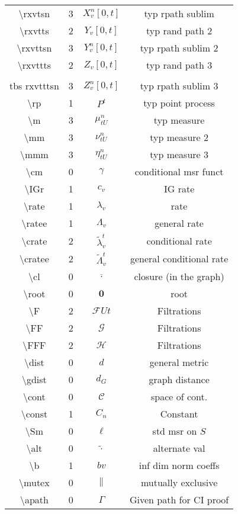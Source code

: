 \documentclass[12pt]{article}
\newcommand{\mc}{\mathcal}
\newcommand{\ov}{\overline}
\newcommand{\tbs}{\textbackslash}
\renewcommand{\root}{\mathbf{0}}				%
\renewcommand{\v}{v}							%
\renewcommand{\U}{U}							%
\renewcommand{\S}{S}							%
\renewcommand{\b}{b}							%
\renewcommand{\t}{t}							%
\newcommand{\F}{\mc{F}}							%
\newcommand{\FG}[2]{\mc{G}}						%
\newcommand{\FH}[2]{\mc{H}}						%
\newcommand{\cl}{\ov}							%
\newcommand{\numb}{n}								%
\newcommand{\rxvtsn}[3]{X_{#1}^{#3}{#2}}			%
\newcommand{\rxvtts}[2]{Y_{#1}{#2}}					%
\newcommand{\rxvttsn}[3]{Y_{#1}^{#3}{#2}}			%
\newcommand{\rxvttts}[2]{Z_{#1}{#2}}				%
\newcommand{\rxvtttsn}[3]{Z_{#1}^{#3}{#2}}			%
\newcommand{\rp}[1]{P^{#1}}							%
\newcommand{\m}[3]{\mu_{#2#1}^{#3}}						%
\newcommand{\mm}[3]{\nu_{#2#1}^{#3}}						%
\newcommand{\mmm}[3]{\eta_{#2#1}^{#3}}						%
\newcommand{\cm}{\gamma}							%
\newcommand{\IGr}[1]{c_{#1}}						%
\newcommand{\rate}[1]{\lambda_{#1}}					%
\newcommand{\ratee}[1]{\Lambda_{#1}}				%
\newcommand{\crate}[2]{\alt{\lambda}_{#1}^{#2}}		%
\newcommand{\cratee}[2]{\alt{\Lambda}_{#1}^{#2}} 	%
\newcommand{\dist}{d}								%
\newcommand{\gdist}{d_G}							%
\newcommand{\cont}{\mc{C}}							%
\newcommand{\const}[1]{C_{#1}}						%
\newcommand{\Sm}{\ell}								%
\newcommand{\alt}{\widetilde}						%
\newcommand{\mutex}{\|}								%
\newcommand{\apath}{\Gamma}						%
\begin{document}
\begin{longtable}{c|c|c|c}
\tbs rxvtsn&3&\(\rxvtsn{\v}{[0,\t]}{\numb}\)	&typ rpath sublim\\
\tbs rxvtts&2&\(\rxvtts{\v}{[0,\t]}\)					&typ rand path 2\\
\tbs rxvttsn&3&\(\rxvttsn{\v}{[0,\t]}{\numb}\)	&typ rpath sublim 2\\
\tbs rxvttts&2&\(\rxvttts{\v}{[0,\t]}\)				&typ rand path 3\\\\tbs rxvtttsn&3&\(\rxvtttsn{\v}{[0,\t]}{\numb}\)	&typ rpath sublim 3\\
\tbs rp&1& \(\rp{\t}\)						&typ point process\\
\tbs m&3&\(\m{\U}{\t}{\numb}\)						&typ measure\\
\tbs mm&3&\(\mm{\U}{\t}{\numb}\)						&typ measure 2\\
\tbs mmm&3&\(\mmm{\U}{\t}{\numb}\)						&typ measure 3\\
\tbs cm&0&\(\cm\)							&conditional msr funct\\
\tbs IGr&1&\(\IGr{\v}\)						&IG rate\\
\tbs rate&1&\(\rate{\v}\)					&rate\\
\tbs ratee&1&\(\ratee{\v}\)					&general rate\\
\tbs crate&2&\(\crate{\v}{\t}\)		&conditional rate\\
\tbs cratee&2&\(\cratee{\v}{\t}\)		&general conditional rate\\
\tbs cl&0&\(\cl{\cdot}\)			&closure (in the graph)\\
\tbs root&0&\(\root\)				&root\\
\tbs F&2&\(\F{\U}{\t}\)&Filtrations\\
\tbs FF&2&\(\FG{\U}{\t}\)&Filtrations\\
\tbs FFF&2&\(\FH{\U}{\t}\)&Filtrations\\
\tbs dist&0& \(\dist\)				&general metric\\
\tbs gdist &0& \(\gdist\)			&graph distance\\
\tbs cont &0& \(\cont\)				&space of cont. \\
\tbs const &1& \(\const{\numb}\)	&Constant\\
\tbs Sm&0&\(\Sm\)							&std msr on \(\S\)\\
\tbs alt&0&\(\widetilde{\cdot}\)			&alternate val\\
\tbs b&1& \(\b{\v}\)						&inf dim norm coeffs\\
\tbs mutex&0&\(\mutex\)						&mutually exclusive\\
\tbs apath&0&\(\apath\)						&Given path for CI proof\\

\end{longtable}
\end{document}
